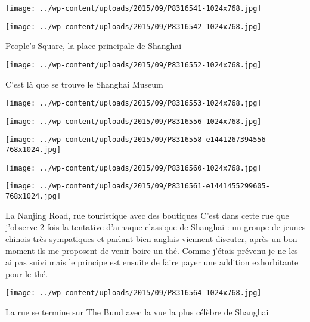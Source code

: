  \newline
 \newline
\centerline{\texttt{[image: ../wp-content/uploads/2015/09/P8316541-1024x768.jpg]} } 
 \newline
 \newline
\centerline{\texttt{[image: ../wp-content/uploads/2015/09/P8316542-1024x768.jpg]} } 
 \newline
 People's Square, la place principale de Shanghai \newline
 \newline
\centerline{\texttt{[image: ../wp-content/uploads/2015/09/P8316552-1024x768.jpg]} } 
 \newline
 C'est là que se trouve le Shanghai Museum \newline
 \newline
\centerline{\texttt{[image: ../wp-content/uploads/2015/09/P8316553-1024x768.jpg]} } 
 \newline
 \newline
\centerline{\texttt{[image: ../wp-content/uploads/2015/09/P8316556-1024x768.jpg]} } 
 \newline
 \newline
\centerline{\texttt{[image: ../wp-content/uploads/2015/09/P8316558-e1441267394556-768x1024.jpg]} } 
 \newline
 \newline
\centerline{\texttt{[image: ../wp-content/uploads/2015/09/P8316560-1024x768.jpg]} } 
 \newline
 \newline
\centerline{\texttt{[image: ../wp-content/uploads/2015/09/P8316561-e1441455299605-768x1024.jpg]} } 
 \newline
 La Nanjing Road, rue touristique avec des boutiques \newline
 C'est dans cette rue que j'observe 2 fois la tentative d'arnaque classique de Shanghai : un groupe de jeunes chinois très sympatiques et parlant bien anglais viennent discuter, après un bon moment ils me proposent de venir boire un thé. Comme j'étais prévenu je ne les ai pas suivi mais le principe est ensuite de faire payer une addition exhorbitante pour le thé. \newline
 \newline
\centerline{\texttt{[image: ../wp-content/uploads/2015/09/P8316564-1024x768.jpg]} } 
 \newline
 La rue se termine sur The Bund avec la vue la plus célèbre de Shanghai \newline
